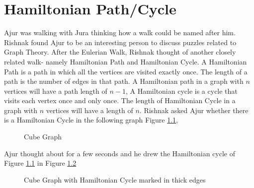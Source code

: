 \chapter{Hamiltonian Path/Cycle}
Ajur was walking with Jura thinking how a walk could be named after him. Rishnak found Ajur to be an interesting person to discuss puzzles related to Graph Theory. After the Eulerian Walk, Rishnak thought of another closely related walk- namely Hamiltonian Path and Hamiltonian Cycle. A Hamiltonian Path is a path in which all the vertices are visited exactly once. 
The length of a path is the number of edges in that path. A Hamiltonian path in a graph with $n$ vertices will have a path length of $n-1$, A Hamiltonian cycle is a cycle that visits each vertex once and only once. The length of Hamiltonian Cycle in a graph with $n$ vertices will have a length of $n$. Rishnak asked Ajur whether there is a Hamiltonian Cycle in the following graph Figure \ref{5g1},
\begin{figure}
\begin{center}
\caption{ Cube Graph }\label{5g1}
\end{center}
\end{figure}

Ajur thought about for a few seconds and he drew the Hamiltonian cycle of Figure \ref{5g1} in Figure \ref {5g2}

\begin{figure}
\begin{center}
\caption{ Cube Graph with Hamiltonian  Cycle marked in thick edges}\label{5g2}
\end{center}
\end{figure}

